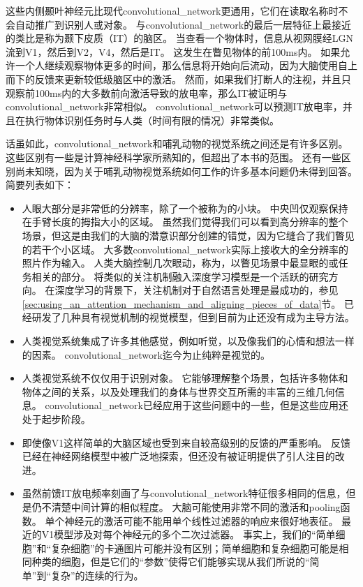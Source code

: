  
这些内侧颞叶神经元比现代\gls{convolutional_network}更通用，它们在读取名称时不会自动推广到识别人或对象。
与\gls{convolutional_network}的最后一层特征上最接近的类比是称为颞下皮质（IT）的脑区。
当查看一个物体时，信息从视网膜经LGN流到V1，然后到V2，V4，然后是IT。
这发生在瞥见物体的前100ms内。
如果允许一个人继续观察物体更多的时间，那么信息将开始向后流动，因为大脑使用自上而下的反馈来更新较低级脑区中的激活。
然而，如果我们打断人的注视，并且只观察前100ms内的大多数前向激活导致的放电率，那么IT被证明与\gls{convolutional_network}非常相似。
\gls{convolutional_network}可以预测IT放电率，并且在执行物体识别任务时与人类（时间有限的情况）非常类似\citep{dicarlo-tutorial-2013}。

话虽如此，\gls{convolutional_network}和哺乳动物的视觉系统之间还是有许多区别。
这些区别有一些是计算神经科学家所熟知的，但超出了本书的范围。
还有一些区别尚未知晓，因为关于哺乳动物视觉系统如何工作的许多基本问题仍未得到回答。
简要列表如下：
\begin{itemize}
  \item 人眼大部分是非常低的分辨率，除了一个被称为的小块。
  中央凹仅观察保持在手臂长度的拇指大小的区域。
  虽然我们觉得我们可以看到高分辨率的整个场景，但这是由我们的大脑的潜意识部分创建的错觉，因为它缝合了我们瞥见的若干个小区域。
  大多数\gls{convolutional_network}实际上接收大的全分辨率的照片作为输入。
  人类大脑控制几次眼动，称为，以瞥见场景中最显眼的或任务相关的部分。
  将类似的关注机制融入深度学习模型是一个活跃的研究方向。
  在深度学习的背景下，关注机制对于自然语言处理是最成功的，参见\ref{sec:using_an_attention_mechanism_and_aligning_pieces_of_data}节。
  已经研发了几种具有视觉机制的视觉模型，但到目前为止还没有成为主导方法\citep{Larochelle2010,Denil2012}。
  
  \item 人类视觉系统集成了许多其他感觉，例如听觉，以及像我们的心情和想法一样的因素。
  \gls{convolutional_network}迄今为止纯粹是视觉的。
  
  \item 人类视觉系统不仅仅用于识别对象。
  它能够理解整个场景，包括许多物体和物体之间的关系，以及处理我们的身体与世界交互所需的丰富的三维几何信息。
  \gls{convolutional_network}已经应用于这些问题中的一些，但是这些应用还处于起步阶段。
  
  \item 即使像V1这样简单的大脑区域也受到来自较高级别的反馈的严重影响。
  反馈已经在神经网络模型中被广泛地探索，但还没有被证明提供了引人注目的改进。
  
  \item 虽然前馈IT放电频率刻画了与\gls{convolutional_network}特征很多相同的信息，但是仍不清楚中间计算的相似程度。
  大脑可能使用非常不同的激活和\gls{pooling}函数。
  单个神经元的激活可能不能用单个线性过滤器的响应来很好地表征。
  最近的V1模型涉及对每个神经元的多个二次过滤器\citep{rust:2005}。
  事实上，我们的``简单细胞''和``复杂细胞''的卡通图片可能并没有区别；简单细胞和复杂细胞可能是相同种类的细胞，但是它们的``参数''使得它们能够实现从我们所说的``简单''到``复杂''的连续的行为。
\end{itemize}
 
